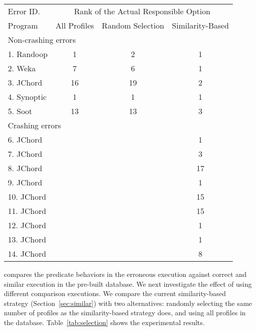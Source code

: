 \begin{table}[t]
\setlength{\tabcolsep}{.24\tabcolsep}
\begin{tabular}{|l|c|c||c|}
\hline
 Error ID. & \multicolumn{3}{|c|}{Rank of the Actual Responsible Option } \\
\cline{2-4}
 Program & All Profiles & Random Selection&  Similarity-Based\\
 \hline
\hline
\multicolumn{4}{|l|}{Non-crashing errors}   \\
 \hline
 1. Randoop & 1 & 2 & 1\\
 2. Weka & 7 & 6 & 1\\
 3. JChord & 16 & 19 & 2\\
 4. Synoptic & 1 & 1 & 1\\
 5. Soot & 13 & 13 & 3\\
\hline
\hline
\multicolumn{4}{|l|}{Crashing errors}   \\
\hline
 6. JChord & & &1\\
 7. JChord & & &3\\
 8. JChord & & &17\\
 9. JChord & & &1\\
 10. JChord & & &15\\
 11. JChord & & &15\\
 12. JChord & & &1\\
 13. JChord & & &1\\
 14. JChord & & &8\\
\hline
\end{tabular}

\end{table}


\ourtool compares the predicate behaviors in the erroneous execution against
correct and similar execution in the pre-built database.
We next investigate the effect of using different comparison
executions. We compare the current similarity-based strategy
 (Section~\ref{sec:similar}) with two alternatives: randomly selecting the same number of
profiles as the similarity-based strategy does, and using
all profiles in the database. Table~\ref{tab:selection} shows the experimental results.

